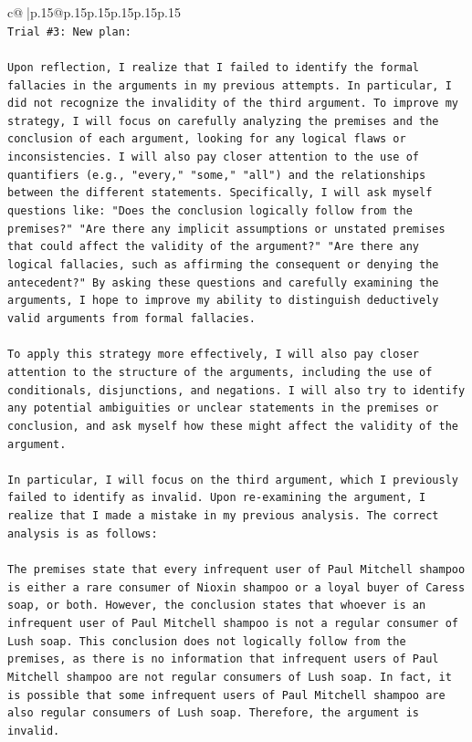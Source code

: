 \documentclass{article}
\begin{document}
{\begin{supertabular}{c@{$\;$}|p{.15\linewidth}@{}p{.15\linewidth}p{.15\linewidth}p{.15\linewidth}p{.15\linewidth}p{.15\linewidth}}
{{{\\ 
\texttt{Trial \#3: New plan: } \\
\\ 
\texttt{Upon reflection, I realize that I failed to identify the formal fallacies in the arguments in my previous attempts. In particular, I did not recognize the invalidity of the third argument. To improve my strategy, I will focus on carefully analyzing the premises and the conclusion of each argument, looking for any logical flaws or inconsistencies. I will also pay closer attention to the use of quantifiers (e.g., "every," "some," "all") and the relationships between the different statements. Specifically, I will ask myself questions like: "Does the conclusion logically follow from the premises?" "Are there any implicit assumptions or unstated premises that could affect the validity of the argument?" "Are there any logical fallacies, such as affirming the consequent or denying the antecedent?" By asking these questions and carefully examining the arguments, I hope to improve my ability to distinguish deductively valid arguments from formal fallacies.} \\
\\ 
\texttt{To apply this strategy more effectively, I will also pay closer attention to the structure of the arguments, including the use of conditionals, disjunctions, and negations. I will also try to identify any potential ambiguities or unclear statements in the premises or conclusion, and ask myself how these might affect the validity of the argument.} \\
\\ 
\texttt{In particular, I will focus on the third argument, which I previously failed to identify as invalid. Upon re{-}examining the argument, I realize that I made a mistake in my previous analysis. The correct analysis is as follows:} \\
\\ 
\texttt{The premises state that every infrequent user of Paul Mitchell shampoo is either a rare consumer of Nioxin shampoo or a loyal buyer of Caress soap, or both. However, the conclusion states that whoever is an infrequent user of Paul Mitchell shampoo is not a regular consumer of Lush soap. This conclusion does not logically follow from the premises, as there is no information that infrequent users of Paul Mitchell shampoo are not regular consumers of Lush soap. In fact, it is possible that some infrequent users of Paul Mitchell shampoo are also regular consumers of Lush soap. Therefore, the argument is invalid.} \\
}}}
\end{supertabular}}
\end{document}

